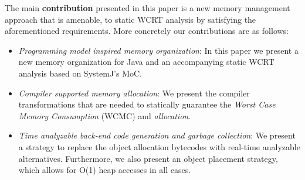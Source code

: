 
The main \textbf{contribution} presented in this paper is a new memory
management approach that is amenable, to static WCRT analysis by
satisfying the aforementioned requirements. More concretely our
contributions are as follows:

\begin{itemize}
\item \textit{Programming model inspired memory organization}: In this
  paper we present a new memory organization for Java and an
  accompanying static WCRT analysis based on SystemJ's MoC.
\item \textit{Compiler supported memory allocation}: We present the
  compiler transformations that are needed to statically guarantee the
  \textit{Worst Case Memory Consumption} (WCMC) and \textit{allocation}.
\item \textit{Time analyzable back-end code generation and garbage
    collection}: We present a strategy to replace the object allocation
  bytecodes with real-time analyzable alternatives. Furthermore, we also
  present an object placement strategy, which allows for O(1) heap
  accesses in all cases.
\end{itemize}





